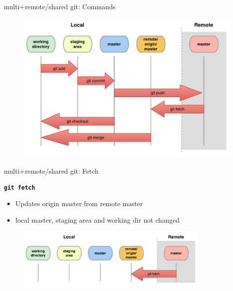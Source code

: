 \documentclass{beamer}
\newcommand{\git}{git\xspace}
\begin{document}

\begin{frame}{multi+remote/shared \git: Commands}
  \begin{figure}
    \centering
    \includegraphics[height=0.8\textheight]{own_fig/local-remote}
  \end{figure}  
\end{frame}


\begin{frame}{multi+remote/shared \git: Fetch}
  \begin{center}
    \texttt{\textbf{git fetch}}
  \end{center}
  \begin{itemize}
  \item Updates origin master from remote master
  \item local master, staging area and working dir not changed
  \end{itemize}
  \begin{figure}
    \centering
    \includegraphics[width=9.5cm]{figs/local-remote-fetch}
  \end{figure}
\end{frame}

\end{document}
